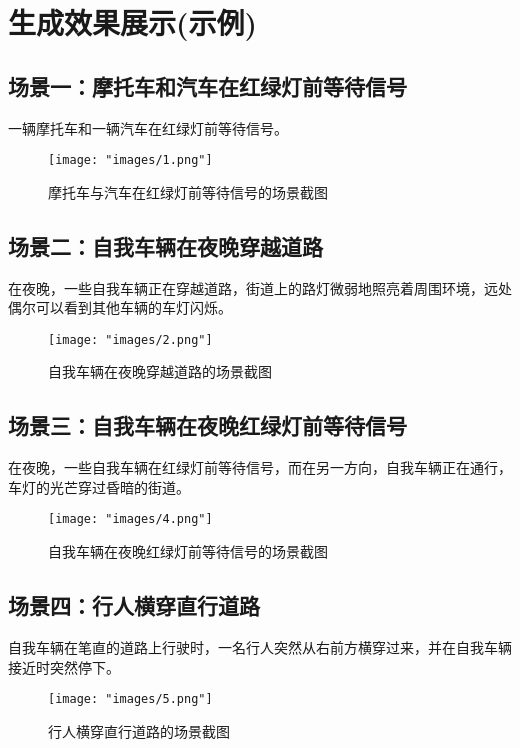 \section{生成效果展示(示例)}

\subsection{场景一：摩托车和汽车在红绿灯前等待信号}
\indent 一辆摩托车和一辆汽车在红绿灯前等待信号。\\

\begin{figure}[H]
	\centering
	\texttt{[image: "images/1.png"]}
	\caption{摩托车与汽车在红绿灯前等待信号的场景截图}
	\label{fig:redlight_motorbike_car}
\end{figure}

\subsection{场景二：自我车辆在夜晚穿越道路}
\indent 在夜晚，一些自我车辆正在穿越道路，街道上的路灯微弱地照亮着周围环境，远处偶尔可以看到其他车辆的车灯闪烁。\\

\begin{figure}[H]
	\centering
	\texttt{[image: "images/2.png"]}
	\caption{自我车辆在夜晚穿越道路的场景截图}
	\label{fig:night_self_driving_cross}
\end{figure}

\subsection{场景三：自我车辆在夜晚红绿灯前等待信号}
\indent 在夜晚，一些自我车辆在红绿灯前等待信号，而在另一方向，自我车辆正在通行，车灯的光芒穿过昏暗的街道。\\

\begin{figure}[H]
	\centering
	\texttt{[image: "images/4.png"]}
	\caption{自我车辆在夜晚红绿灯前等待信号的场景截图}
	\label{fig:night_redlight_cross}
\end{figure}

\subsection{场景四：行人横穿直行道路}
\indent 自我车辆在笔直的道路上行驶时，一名行人突然从右前方横穿过来，并在自我车辆接近时突然停下。\\

\begin{figure}[H]
	\centering
	\texttt{[image: "images/5.png"]}
	\caption{行人横穿直行道路的场景截图}
	\label{fig:pedestrian_crossing}
\end{figure}
